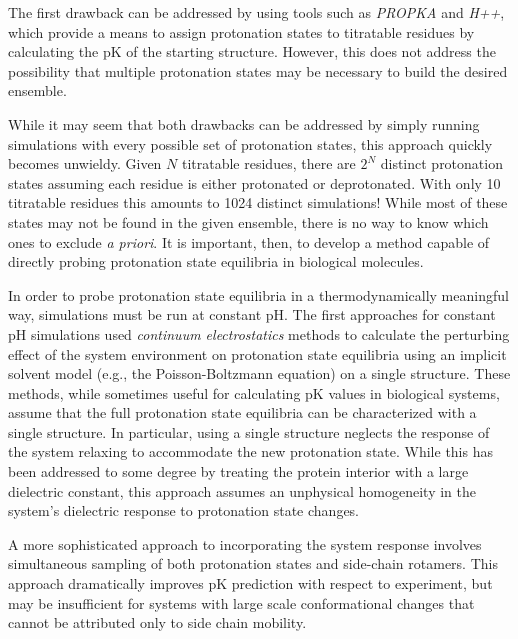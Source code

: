 The first drawback can be addressed by using tools such as \emph{PROPKA}
\cite{Olsson2011} and \emph{H++}, \cite{Myers_Proteins_2006_v63_p928} which
provide a means to assign protonation states to titratable residues by
calculating the pK of the starting structure. However, this does not
address the possibility that multiple protonation states may be necessary to
build the desired ensemble.

While it may seem that both drawbacks can be addressed by simply running
simulations with every possible set of protonation states, this approach quickly
becomes unwieldy. Given $N$ titratable residues, there are $2^N$ distinct
protonation states assuming each residue is either protonated or deprotonated.
With only 10 titratable residues this amounts to 1024 distinct simulations!
While most of these states may not be found in the given ensemble, there is no
way to know which ones to exclude \emph{a priori}. It is important, then, to
develop a method capable of directly probing protonation state equilibria in
biological molecules.

In order to probe protonation state equilibria in a thermodynamically meaningful
way, simulations must be run at constant pH. The first approaches for constant
pH simulations used \emph{continuum electrostatics} methods to calculate the
perturbing effect of the system environment on protonation state equilibria
using an implicit solvent model (e.g., the Poisson-Boltzmann equation) on a
single structure. \cite{Bashford_Biochemistry_1990_v29_p10219,
Bashford_JMolBiol_1992_v224_p473, Antosiewicz_JMolBiol_1994_v238_p415} These
methods, while sometimes useful for calculating pK values in biological
systems, assume that the full protonation state equilibria can be characterized
with a single structure. In particular, using a single structure neglects the
response of the system relaxing to accommodate the new protonation state. While
this has been addressed to some degree by treating the protein interior with a
large dielectric constant, \cite{Antosiewicz_JMolBiol_1994_v238_p415} this
approach assumes an unphysical homogeneity in the system's dielectric response
to protonation state changes.

A more sophisticated approach to incorporating the system response involves
simultaneous sampling of both protonation states and side-chain rotamers.
\cite{Song_JComputChem_2009_v30_p2231} This approach dramatically improves
pK prediction with respect to experiment, but may be insufficient for
systems with large scale conformational changes that cannot be attributed only
to side chain mobility.

